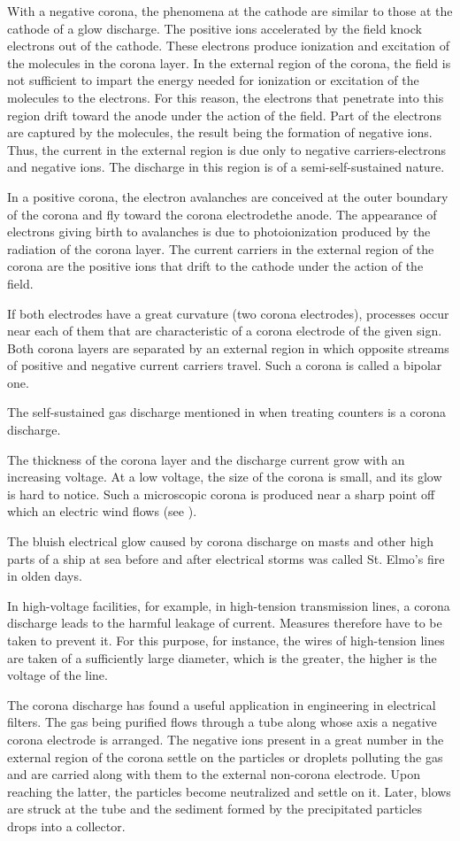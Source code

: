 With a negative corona, the phenomena at the cathode are similar to those at the cathode of a glow discharge.
The positive ions accelerated by the field knock electrons out of the cathode.
These electrons produce ionization and excitation of the molecules in the corona layer.
In the external region of the corona, the field is not sufficient to impart the energy needed for ionization or excitation of the molecules to the electrons.
For this reason, the electrons that penetrate into this region drift toward the anode under the action of the field.
Part of the electrons are captured by the molecules, the result being the formation of negative ions.
Thus, the current in the external region is due only to negative carriers-electrons and negative ions.
The discharge in this region is of a semi-self-sustained nature.

In a positive corona, the electron avalanches are conceived at the outer boundary of the corona and fly toward the corona electrodethe anode.
The appearance of electrons giving birth to avalanches is due to photoionization produced by the radiation of the corona layer.
The current carriers in the external region of the corona are the positive ions that drift to the cathode under the action of the field.

If both electrodes have a great curvature (two corona electrodes), processes occur near each of them that are characteristic of a corona electrode of the given sign.
Both corona layers are separated by an external region in which opposite streams of positive and negative current carriers travel.
Such a corona is called a bipolar one.

The self-sustained gas discharge mentioned in  when treating counters is a corona discharge.

The thickness of the corona layer and the discharge current grow with an increasing voltage.
At a low voltage, the size of the corona is small, and its glow is hard to notice.
Such a microscopic corona is produced near a sharp point off which an electric wind flows (see
).

The bluish electrical glow caused by corona discharge on masts and other high parts of a ship at sea before and after electrical storms was called St. Elmo's fire in olden days.

In high-voltage facilities, for example, in high-tension transmission lines, a corona discharge leads to the harmful leakage of current.
Measures therefore have to be taken to prevent it.
For this purpose, for instance, the wires of high-tension lines are taken of a sufficiently large diameter, which is the greater, the higher is the voltage of the line.

The corona discharge has found a useful application in engineering in electrical filters.
The gas being purified flows through a tube along whose axis a negative corona electrode is arranged.
The negative ions present in a great number in the external region of the corona settle on the particles or droplets polluting the gas and are carried along with them to the external non-corona electrode.
Upon reaching the latter, the particles become neutralized and settle on it.
Later, blows are struck at the tube and the sediment formed by the precipitated particles drops into a collector.
